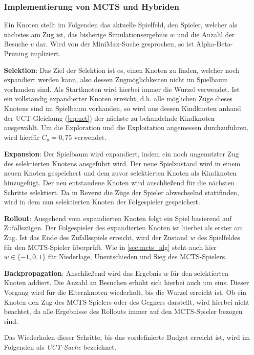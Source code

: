 \documentclass[12pt,a4paper,bibliography=totocnumbered,listof=totocnumbered]{article}
\begin{document}
\subsubsection{Implementierung von MCTS und Hybriden} \label{sec:umsetzung}
Ein Knoten stellt im Folgenden das aktuelle Spielfeld, den Spieler, welcher als nächstes am Zug ist, das bisherige Simulationsergebnis $w$ und die Anzahl der Besuche $v$ dar. Wird von der MiniMax-Suche gesprochen, so ist Alpha-Beta-Pruning impliziert.

\textbf{Selektion}: Das Ziel der Selektion ist es, einen Knoten zu finden, welcher noch expandiert werden kann, also dessen Zugmöglichkeiten nicht im Spielbaum vorhanden sind. Als Startknoten wird hierbei immer die Wurzel verwendet. Ist ein vollständig expandierter Knoten erreicht, d.h. alle möglichen Züge dieses Knotens sind im Spielbaum vorhanden, so wird aus dessen Kindknoten anhand der UCT-Gleichung (\autoref{eq:uct}) der nächste zu behandelnde Kindknoten ausgewählt. Um die Exploration und die Exploitation angemessen durchzuführen, wird hierfür $C_p=0,75$ verwendet.

\textbf{Expansion}: Der Spielbaum wird expandiert, indem ein noch ungenutzter Zug des selektierten Knotens ausgeführt wird. Der neue Spielzustand wird in einem neuen Knoten gespeichert und dem zuvor selektierten Knoten als Kindknoten hinzugefügt. Der neu entstandene Knoten wird anschließend für die nächsten Schritte selektiert. Da in Reversi die Züge der Spieler abwechselnd stattfinden, wird in dem nun selektierten Knoten der Folgespieler gespeichert.

\textbf{Rollout}: Ausgehend vom expandierten Knoten folgt ein Spiel basierend auf Zufallszügen. Der Folgespieler des expandierten Knoten ist hierbei als erster am Zug. Ist das Ende des Zufallsspiels erreicht, wird der Zustand $w$ des Spielfeldes für den MCTS-Spieler überprüft. Wie in \autoref{sec:mcts_alg} steht auch hier $w \in \{-1, 0, 1\}$ für Niederlage, Unentschieden und Sieg des MCTS-Spielers.

\textbf{Backpropagation}: Anschließend wird das Ergebnis $w$ für den selektierten Knoten addiert. Die Anzahl an Besuchen erhöht sich hierbei auch um eins. Dieser Vorgang wird für die Elternknoten wiederholt, bis die Wurzel erreicht ist. Ob ein Knoten den Zug des MCTS-Spielers oder des Gegners darstellt, wird hierbei nicht beachtet, da alle Ergebnisse des Rollouts immer auf den MCTS-Spieler bezogen sind.

Das Wiederholen dieser Schritte, bis das vordefinierte Budget erreicht ist, wird im Folgenden als \emph{UCT-Suche} bezeichnet.\\
\end{document}
